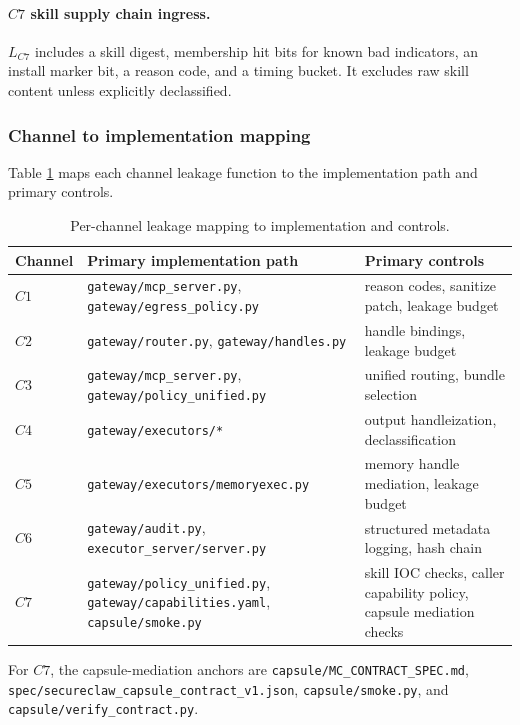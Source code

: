 \paragraph{$C7$ skill supply chain ingress.}
$L_{C7}$ includes a skill digest, membership hit bits for known bad indicators, an install marker bit, a reason code, and a timing bucket.
It excludes raw skill content unless explicitly declassified.

\subsubsection{Channel to implementation mapping}

Table \ref{tab:channel-map} maps each channel leakage function to the implementation path and primary controls.

\begin{table}[t]
\centering
\small
\begin{tabular}{lll}
\toprule
Channel & Primary implementation path & Primary controls \\
\midrule
$C1$ & \texttt{gateway/mcp\_server.py}, \texttt{gateway/egress\_policy.py} & reason codes, sanitize patch, leakage budget \\
$C2$ & \texttt{gateway/router.py}, \texttt{gateway/handles.py} & handle bindings, leakage budget \\
$C3$ & \texttt{gateway/mcp\_server.py}, \texttt{gateway/policy\_unified.py} & unified routing, bundle selection \\
$C4$ & \texttt{gateway/executors/*} & output handleization, declassification \\
$C5$ & \texttt{gateway/executors/memoryexec.py} & memory handle mediation, leakage budget \\
$C6$ & \texttt{gateway/audit.py}, \texttt{executor\_server/server.py} & structured metadata logging, hash chain \\
$C7$ & \texttt{gateway/policy\_unified.py}, \texttt{gateway/capabilities.yaml}, \texttt{capsule/smoke.py} & skill IOC checks, caller capability policy, capsule mediation checks \\
\bottomrule
\end{tabular}
\caption{Per-channel leakage mapping to implementation and controls.}
\label{tab:channel-map}
\end{table}

For $C7$, the capsule-mediation anchors are
\texttt{capsule/MC\_CONTRACT\_SPEC.md},
\texttt{spec/secureclaw\_capsule\_contract\_v1.json},
\texttt{capsule/smoke.py}, and
\texttt{capsule/verify\_contract.py}.

